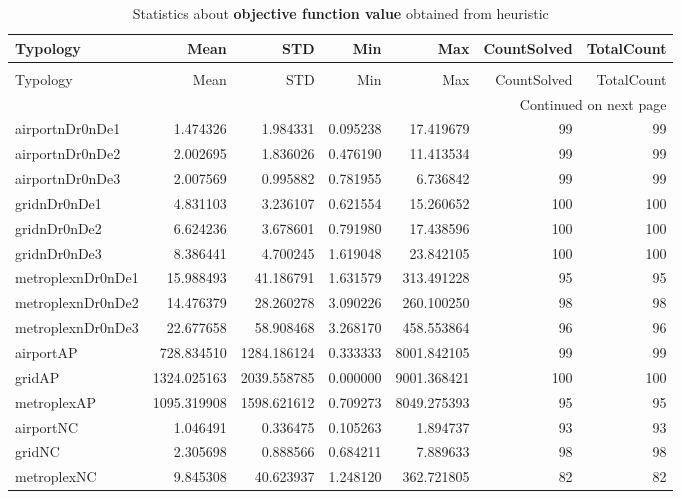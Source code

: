 \documentclass[../../../thesis.tex]{subfiles}
\begin{document}
\tiny
\begin{longtable}{|l|r|r|r|r|r|r|}
\caption{Statistics about \textbf{objective function value} obtained from heuristic} \label{table:heuristic:results} \\ \hline

Typology & Mean & STD & Min & Max & CountSolved & TotalCount \\ \hline

\endfirsthead
\caption[]{Statistics about \textbf{objective function value} obtained from heuristic} \\ \hline

Typology & Mean & STD & Min & Max & CountSolved & TotalCount \\ \hline

\endhead

\multicolumn{7}{r}{Continued on next page} \\ \hline

\endfoot

\endlastfoot
airportnDr0nDe1 & 1.474326 & 1.984331 & 0.095238 & 17.419679 & 99 & 99 \\ \hline
airportnDr0nDe2 & 2.002695 & 1.836026 & 0.476190 & 11.413534 & 99 & 99 \\ \hline
airportnDr0nDe3 & 2.007569 & 0.995882 & 0.781955 & 6.736842 & 99 & 99 \\ \hline
gridnDr0nDe1 & 4.831103 & 3.236107 & 0.621554 & 15.260652 & 100 & 100 \\ \hline
gridnDr0nDe2 & 6.624236 & 3.678601 & 0.791980 & 17.438596 & 100 & 100 \\ \hline
gridnDr0nDe3 & 8.386441 & 4.700245 & 1.619048 & 23.842105 & 100 & 100 \\ \hline
metroplexnDr0nDe1 & 15.988493 & 41.186791 & 1.631579 & 313.491228 & 95 & 95 \\ \hline
metroplexnDr0nDe2 & 14.476379 & 28.260278 & 3.090226 & 260.100250 & 98 & 98 \\ \hline
metroplexnDr0nDe3 & 22.677658 & 58.908468 & 3.268170 & 458.553864 & 96 & 96 \\ \hline
airportAP & 728.834510 & 1284.186124 & 0.333333 & 8001.842105 & 99 & 99 \\ \hline
gridAP & 1324.025163 & 2039.558785 & 0.000000 & 9001.368421 & 100 & 100 \\ \hline
metroplexAP & 1095.319908 & 1598.621612 & 0.709273 & 8049.275393 & 95 & 95 \\ \hline
airportNC & 1.046491 & 0.336475 & 0.105263 & 1.894737 & 93 & 93 \\ \hline
gridNC & 2.305698 & 0.888566 & 0.684211 & 7.889633 & 98 & 98 \\ \hline
metroplexNC & 9.845308 & 40.623937 & 1.248120 & 362.721805 & 82 & 82 \\ \hline
\end{longtable}
\end{document}
